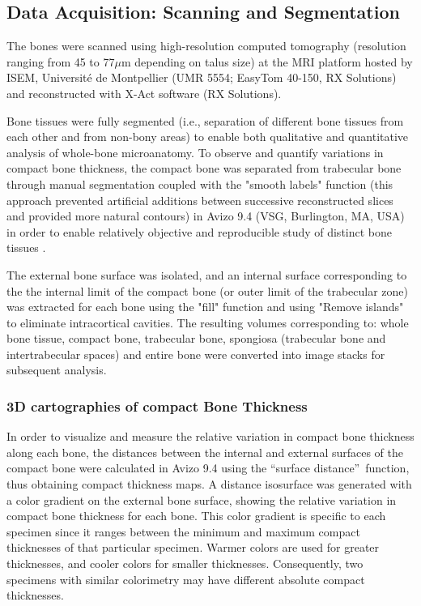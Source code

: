 \documentclass[12pt,a4paper]{article}
\begin{document}
\subsection{Data Acquisition: Scanning and Segmentation}
The bones were scanned using high-resolution computed tomography (resolution ranging from 45 to 77$\mu$m depending on talus size) at the MRI platform hosted by ISEM, Université de Montpellier (UMR 5554; EasyTom 40-150, RX Solutions) and reconstructed with X-Act software (RX Solutions). 

Bone tissues were fully segmented (i.e., separation of different bone tissues from each other and from non-bony areas) to enable both qualitative and quantitative analysis of whole-bone microanatomy. To observe and quantify variations in compact bone thickness, the compact bone was separated from trabecular bone through manual segmentation coupled with the "smooth labels" function (this approach prevented artificial additions between successive reconstructed slices and provided more natural contours) in Avizo 9.4 (VSG, Burlington, MA, USA) in order to enable relatively objective and reproducible study of distinct bone tissues \cite{houssayeSesamoidBonesAlso2022w}.

The external bone surface was isolated, and an internal surface corresponding to the the internal limit of the compact bone (or outer limit of the trabecular zone) was extracted for each bone using the "fill" function and using "Remove islands" to eliminate intracortical cavities. The resulting volumes corresponding to: whole bone tissue, compact bone, trabecular bone, spongiosa (trabecular bone and intertrabecular spaces) and entire bone were converted into image stacks for subsequent analysis.
\subsubsection{3D cartographies of compact Bone Thickness}
In order to visualize and measure the relative variation in compact bone thickness along each bone, the distances between the internal and external surfaces of the compact bone were calculated in Avizo 9.4 using the \textquotedblleft surface distance\textquotedblright~function, thus obtaining compact thickness maps. A distance isosurface was generated with a color gradient on the external bone surface, showing the relative variation in compact bone thickness for each bone. This color gradient is specific to each specimen since it ranges between the minimum and maximum compact thicknesses of that particular specimen. Warmer colors are used for greater thicknesses, and cooler colors for smaller thicknesses. Consequently, two specimens with similar colorimetry may have different absolute compact thicknesses.
\end{document}
